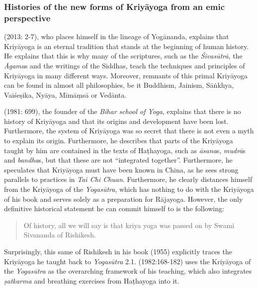 \subsubsection{Histories of the new forms of Kriyāyoga from an emic perspective}

\citeauthor{kriyayoganityananda2013} (2013: 2-7), who places himself in the lineage of Yogānanda, explains that Kriyāyoga is an eternal tradition that stands at the beginning of human history. He explains that this is why many of the scriptures, such as the \textit{Śivasūtrā}, the \textit{Āgama}s and the writings of the Siddhas, teach the techniques and principles of Kriyāyoga in many different ways. Moreover, remnants of this primal Kriyāyoga can be found in almost all philosophies, be it Buddhism, Jainism, Sāṅkhya, Vaiśeṣika, Nyāya, Mīmāṃsā or Vedānta. 

\citeauthor{kriyayogasarasvati1981} (1981: 699), the founder of the \textit{Bihar school of Yoga}, explains that there is no history of Kriyāyoga and that its origins and development have been lost. Furthermore, the system of Kriyāyoga was so secret that there is not even a myth to explain its origin. Furthermore, he describes that parts of the Kriyāyoga taught by him are contained in the texts of Haṭhayoga, such as \textit{āsana}s, \textit{mudrā}s and \textit{bandha}s, but that these are not ``integrated together''. Furthermore, he speculates that Kriyāyoga must have been known in China, as he sees strong parallels to practices in \textit{Tai Chi Chuan}. Furthermore, he clearly distances himself from the Kriyāyoga of the \textit{Yogasūtra}, which has nothing to do with the Kriyāyoga of his book  and serves solely as a preparation for Rājayoga. However, the only definitive historical statement he can commit himself to is the following: \begin{quote} Of history, all we will say is that kriya yoga was passed on by Swami Sivananda of Rishikesh. \end{quote} Surprisingly, this same \citeauthor{shivanandakriya1982} of Rishikesh in his book  (1955) explicitly traces the Kriyāyoga he taught back to \textit{Yogasūtra} 2.1. \citeauthor{shivanandakriya1982} (1982:168-182) uses the Kriyāyoga of the \textit{Yogasūtra} as the overarching framework of his teaching, which also integrates \textit{ṣatkarma} and breathing exercises from Haṭhayoga into it.

